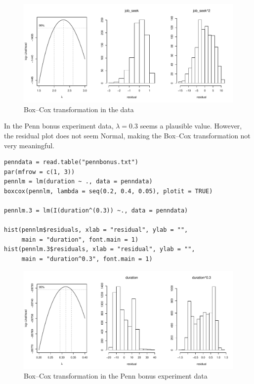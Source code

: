 \begin{figure}[ht]
\centering
\includegraphics[width = 0.95 \textwidth]{figures/boxcox_jobs.pdf}
\caption{Box--Cox transformation in the  data} \label{fig::boxcox-jobs}
\end{figure}

In the Penn bonus experiment data, $\lambda = 0.3$ seems a plausible value. However, the residual plot does not seem Normal, making the Box--Cox transformation not very meaningful.  

\begin{lstlisting}
penndata = read.table("pennbonus.txt")
par(mfrow = c(1, 3))
pennlm = lm(duration ~ ., data = penndata)
boxcox(pennlm, lambda = seq(0.2, 0.4, 0.05), plotit = TRUE)

pennlm.3 = lm(I(duration^(0.3)) ~., data = penndata)

hist(pennlm$residuals, xlab = "residual", ylab = "", 
     main = "duration", font.main = 1)
hist(pennlm.3$residuals, xlab = "residual", ylab = "", 
     main = "duration^0.3", font.main = 1)
\end{lstlisting}


\begin{figure}[ht]
\centering
\includegraphics[width =0.95 \textwidth]{figures/boxcox_penn.pdf}
\caption{Box--Cox transformation in the Penn bonus experiment data} \label{fig::boxcox-penn}
\end{figure}

